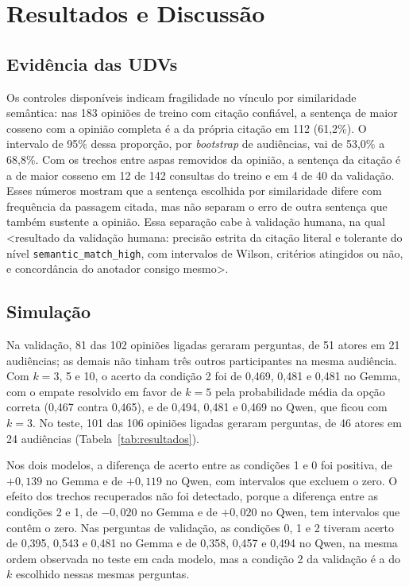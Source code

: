 \section{Resultados e Discuss\~ao}
\label{sec:resultados}

\subsection{Evidência das UDVs}
\label{sec:resultados-udv}

Os controles disponíveis indicam fragilidade no vínculo por similaridade semântica: nas 183 opiniões
de treino com citação confiável, a sentença de maior cosseno com a opinião completa é a da própria
citação em 112 (61,2\%). O intervalo de 95\% dessa proporção, por \textit{bootstrap} de audiências,
vai de 53,0\% a 68,8\%. Com os trechos entre aspas removidos da opinião, a sentença da citação é a
de maior cosseno em 12 de 142 consultas do treino e em 4 de 40 da validação. Esses números mostram
que a sentença escolhida por similaridade difere com frequência da passagem citada, mas não separam
o erro de outra sentença que também sustente a opinião. Essa separação cabe à validação humana, na
qual <resultado da validação humana: precisão estrita da citação literal e tolerante do nível
\texttt{semantic\_match\_high}, com intervalos de Wilson, critérios atingidos ou não, e concordância
do anotador consigo mesmo>.

\subsection{Simulação}
\label{sec:resultados-simulacao}



Na validação, 81 das 102 opiniões ligadas geraram perguntas, de 51 atores em 21 audiências; as
demais não tinham três outros participantes na mesma audiência. Com $k = 3$, 5 e 10, o acerto da
condição 2 foi de 0,469, 0,481 e 0,481 no Gemma, com o empate resolvido em favor de $k = 5$ pela
probabilidade média da opção correta (0,467 contra 0,465), e de 0,494, 0,481 e 0,469 no Qwen, que
ficou com $k = 3$. No teste, 101 das 106 opiniões ligadas geraram perguntas, de 46 atores em 24
audiências (Tabela~\ref{tab:resultados}).

Nos dois modelos, a diferença de acerto entre as condições 1 e 0 foi positiva, de $+0{,}139$ no
Gemma e de $+0{,}119$ no Qwen, com intervalos que excluem o zero. O efeito dos trechos recuperados
não foi detectado, porque a diferença entre as condições 2 e 1, de $-0{,}020$ no Gemma e de
$+0{,}020$ no Qwen, tem intervalos que contêm o zero. Nas perguntas de validação, as condições 0, 1 e
2 tiveram acerto de 0,395, 0,543 e 0,481 no Gemma e de 0,358, 0,457 e 0,494 no Qwen, na mesma ordem
observada no teste em cada modelo, mas a condição 2 da validação é a do $k$ escolhido nessas mesmas
perguntas.

